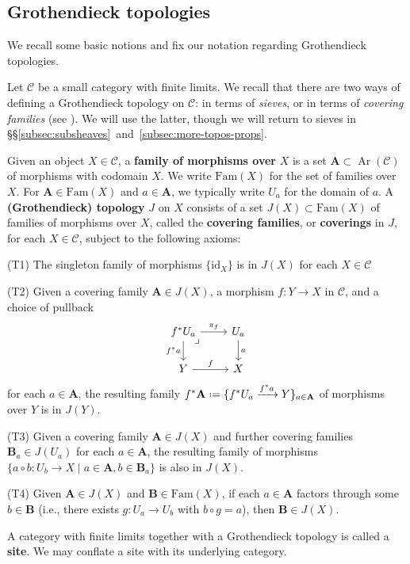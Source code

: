 \documentclass[11pt]{amsart}
\newcommand\Ar{\operatorname{Ar}}
\newcommand\bA{\mathbf{A}}
\newcommand\bB{\mathbf{B}}
\newcommand\cC{\mathcal{C}}
\newcommand\defeq{\mathrel{\vcenter{\baselineskip0.5ex \lineskiplimit0pt \hbox{.}\hbox{.}}} =}
\newcommand\defword[1]{\textbf{#1}}
\newcommand\Fam{\mathrm{Fam}}
\newcommand\id{\mathrm{id}}
\newcommand\pb[1][rd]{\ar[#1, phantom, "\lrcorner", pos=0]}
\newcommand\set[2][]{#1\{{#2}#1\}}
\newcommand\tox[2][]{\xrightarrow[#1]{#2}}
\theoremstyle{definition}
\theoremstyle{remark}
\theoremstyle{plain}
\begin{document}
\subsection{Grothendieck topologies}\label{subsection:topologies}
We recall some basic notions and fix our notation regarding Grothendieck topologies.

Let $\cC$ be a small category with finite limits.
We recall that there are two ways of defining a Grothendieck topology on $\cC$: in terms of \emph{sieves}, or in terms of \emph{covering families} (see \cite[\S1.1]{makkai-reyes-focl}).
We will use the latter, though we will return to sieves in \S\S\ref{subsec:subsheaves}~and~\ref{subsec:more-topos-props}.

Given an object $X \in \cC$, a \defword{family of morphisms over} $X$ is a set $\bA \subset \Ar(\cC)$ of morphisms with codomain $X$.
We write $\Fam(X)$ for the set of families over $X$.
For \( \bA \in \Fam(X) \) and \( a \in \bA \), we typically write \( U_a \) for the domain of \( a \).
A \defword{(Grothendieck) topology} $J$ on $X$ consists of a set $J(X) \subset \Fam(X)$ of families of morphisms over $X$, called the \defword{covering families}, or \defword{coverings} in $J$, for each $X \in \cC$, subject to the following axioms:

(T1) The singleton family of morphisms $\set{\id_X}$ is in $J(X)$ for each $X \in \cC$

(T2) Given a covering family $\bA \in J(X)$, a morphism $f \colon Y \to X$ in $\cC$, and a choice of pullback
\[
  \begin{tikzcd}
    f^*U_a \ar[r, "\pi_f"] \ar[d, "f^*a"'] \pb & U_a \ar[d, "a"] \\
    Y \ar[r, "f"] & X
  \end{tikzcd}
\]
for each $a \in \bA$, the resulting family $f^*\bA \defeq \set{f^*U_a \tox{f^*a} Y}_{a \in \bA}$ of morphisms over $Y$ is in $J(Y)$.

(T3) Given a covering family $\bA \in J(X)$ and further covering families $\bB_a \in J(U_a)$ for each $a \in \bA$, the resulting family of morphisms $\set{a \circ b \colon U_b \to X \mid a \in \bA, b \in \bB_a }$ is also in $J(X)$.

(T4) Given $\bA \in J(X)$ and $\bB \in \Fam(X)$, if each $a \in \bA$ factors through some $b \in \bB$ (i.e., there exists $g \colon U_a \to U_b$ with $b \circ g = a$), then $\bB \in J(X)$.

A category with finite limits together with a Grothendieck topology is called a \defword{site}.
We may conflate a site with its underlying category.
\end{document}
